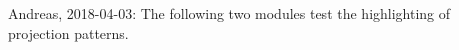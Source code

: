 \documentclass{article}
\begin{document}
\begin{code}%
\>[0]\AgdaSpace{}%
\AgdaSpace{}%
\<%
\\
\>[0][@{}l@{\AgdaIndent{0}}]%
\>[2]\AgdaSpace{}%
\AgdaSymbol{:}\AgdaSpace{}%
\AgdaSpace{}%
\AgdaSymbol{\{}\AgdaSpace{}%
\AgdaSpace{}%
\AgdaSymbol{:}\AgdaSpace{}%
\AgdaSymbol{\}}\AgdaSpace{}%
\AgdaSpace{}%
\AgdaSpace{}%
\AgdaSpace{}%
\<%
\\
%
\>[2]\AgdaSpace{}%
\AgdaSymbol{=}\AgdaSpace{}%
\<%
\\
\>[2][@{}l@{\AgdaIndent{0}}]%
\>[4]\AgdaSymbol{\{}\AgdaSpace{}%
%
\>[9]\AgdaSymbol{=}\AgdaSpace{}%
\<%
\\
%
\>[4]\AgdaSymbol{;}\AgdaSpace{}%
%
\>[9]\AgdaSymbol{=}\AgdaSpace{}%
\<%
\\
%
\>[4]\AgdaSymbol{;}\AgdaSpace{}%
%
\>[112I]\AgdaSymbol{=}\AgdaSpace{}%
\<%
\\
\>[.][@{}l@{}]\<[112I]%
\>[8]\AgdaSymbol{\{}\AgdaSpace{}%
%
\>[13]\AgdaSymbol{=}\AgdaSpace{}%
\<%
\\
%
\>[8]\AgdaSymbol{;}\AgdaSpace{}%
%
\>[13]\AgdaSymbol{=}\AgdaSpace{}%
\<%
\\
%
\>[8]\AgdaSymbol{\}}\<%
\\
%
\>[4]\AgdaSymbol{\}}\<%
\end{code}

Andreas, 2018-04-03: The following two modules test the highlighting of projection patterns.
\end{document}
